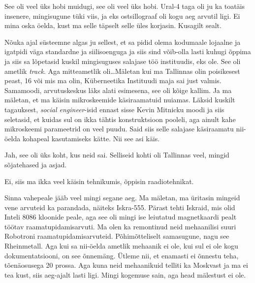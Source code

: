 
See oli veel üks hobi muidugi, see oli veel üks hobi. Ural-4 
taga oli ju ka toatäis insenere, mingisugune tüki viis, ja eks ostsillograaf 
oli kogu aeg arvutil ligi. Ei mina oska öelda, kust ma selle täpselt selle üles 
korjasin. Kusagilt sealt. 


Nõuka ajal süsteemne algas ju sellest, et sa pidid olema kodumaale lojaalne ja 
igatpidi väga standardne ja siilisoenguga ja siis sind võib-olla lasti kuhugi 
õppima ja siis sa lõpetasid kuskil mingisuguses salajase töö instituudis, eks 
ole. See oli  ametlik \emph{track}. Aga mitteametlik oli\ldots Mäletan kui ma 
Tallinnas olin poisikesest peast,  16 või mis ma olin, Küberneetika Instituudi 
maja sai just valmis. Samamoodi, arvutuskeskus 
läks alati esimesena, see oli kõige kallim. Ja  ma mäletan, et ma käisin  
mikroskeemide käsiraamatuid nuiamas. Läksid kuskilt tagauksest, \emph{social 
engineer}-isid ennast sisse Kevin Mitnicku moodi ja 
siis seletasid, et kuidas sul on ikka tähtis konstruktsioon pooleli, aga ainult 
kahe mikroskeemi parameetrid on veel puudu. Said siis selle salajase 
käsiraamatu nii-öelda kohapeal kasutamiseks kätte. Nii see asi käis. 


Jah, see oli üks koht, kus neid sai. Selliseid kohti oli Tallinnas veel,  
mingid sõjatehased ja asjad. 


Ei, siis ma ikka veel käisin tehnikumis, õppisin raadiotehnikat. 


Sinna vahepeale jääb veel mingi segane aeg. Ma mäletan, ma üritasin mingeid 
vene arvuteid ka parandada, näiteks Iskra-555.  Pärast 
tehti Iskraid, mis olid Inteli 8086 kloonide peale, aga see oli mingi ise 
leiutatud magnetkaardi pealt töötav raamatupidamisarvuti. Ma olen ka remontinud 
neid mehaanilisi suuri Robotroni raamatupidamisarvuteid. Põhimõtteliselt 
samasugune, nagu see Rheinmetall. Aga kui sa nii-öelda ametlik mehaanik ei ole, 
kui sul ei ole kogu dokumentatsiooni, on see õnnemäng. Ütleme nii, et enamasti 
ei õnnestu teha, tõenäosusega 20 prossa. Aga kuna neid mehaanikuid telliti ka 
Moskvast ja ma ei tea kust, siis aeg-ajalt lasti ligi. Mingi kogemuse sain, aga 
head mälestust ei ole. 

